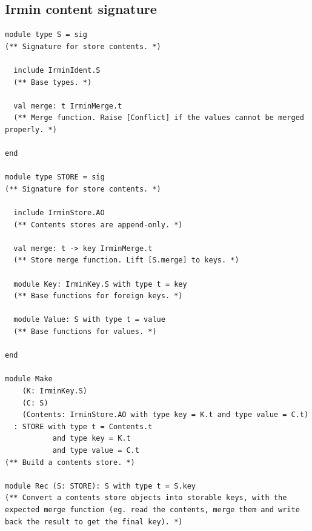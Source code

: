 \documentclass{article}
\renewcommand{\-}{\hyp}
\newcommand{\irmin}{Irmin\xspace}
\begin{document}
\subsection{\irmin content signature}
\begin{lstlisting}
module type S = sig
(** Signature for store contents. *)

  include IrminIdent.S
  (** Base types. *)

  val merge: t IrminMerge.t
  (** Merge function. Raise [Conflict] if the values cannot be merged properly. *)

end

module type STORE = sig
(** Signature for store contents. *)

  include IrminStore.AO
  (** Contents stores are append-only. *)

  val merge: t -> key IrminMerge.t
  (** Store merge function. Lift [S.merge] to keys. *)

  module Key: IrminKey.S with type t = key
  (** Base functions for foreign keys. *)

  module Value: S with type t = value
  (** Base functions for values. *)

end

module Make
    (K: IrminKey.S)
    (C: S)
    (Contents: IrminStore.AO with type key = K.t and type value = C.t)
  : STORE with type t = Contents.t
           and type key = K.t
           and type value = C.t
(** Build a contents store. *)

module Rec (S: STORE): S with type t = S.key
(** Convert a contents store objects into storable keys, with the expected merge function (eg. read the contents, merge them and write back the result to get the final key). *)
\end{lstlisting}

\newpage
\end{document}
